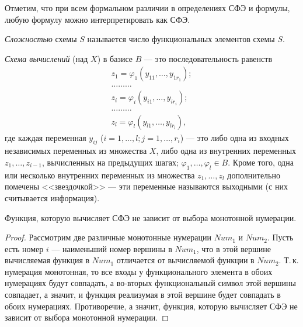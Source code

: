 Отметим, что при всем формальном различии в определениях СФЭ и формулы, любую формулу можно интерпретировать как СФЭ.

\begin{definition}
    \textit{Сложностью} схемы $S$ называется число функциональных элементов схемы $S$.
\end{definition}

\begin{definition}
    \textit{Схема вычислений} (над $X$) в базисе $B$ --- это последовательность равенств
    \begin{gather*}
        z_1 = \varphi_1(y_{11}, \ldots, y_{1r_1});\\
        \ldots \ldots \ldots\\
        z_i = \varphi_i(y_{i1}, \ldots, y_{ir_i});\\
        \ldots \ldots \ldots\\
        z_l = \varphi_l(y_{l1}, \ldots, y_{lr_l}),
    \end{gather*}
    где каждая переменная $y_{ij}$ ($i = 1, \ldots, l; j = 1, \ldots, r_i$) --- это либо одна из входных независимых переменных из множества $X$, либо одна из внутренних переменных $z_1, \ldots, z_{i-1}$, вычисленных на предыдущих шагах; $\varphi_1, \ldots, \varphi_l \in B$. Кроме того, одна или несколько внутренних переменных из множества $z_1, \ldots, z_l$ дополнительно помечены <<звездочкой>> --- эти переменные называются выходными (с них считывается информация).
\end{definition}

\begin{theorem}
    Функция, которую вычисляет СФЭ не зависит от выбора монотонной нумерации.
\end{theorem}

\begin{proof}
    Рассмотрим две различные монотонные нумерации $Num_1$ и $Num_2$. Пусть есть номер $i$ --- наименьший номер вершины в $Num_1$, что в этой вершине вычисляемая функция в $Num_1$ отличается от вычисляемой функции в $Num_2$. Т.\,к. нумерация монотонная, то все входы у функционального элемента в обоих нумерациях будут совпадать, а во-вторых функциональный символ этой вершины совпадает, а значит, и функция реализумая в этой вершине будет совпадать в обоих нумерациях. Противоречие, а значит, функция, которую вычисляет СФЭ не зависит от выбора монотонной нумерации.
\end{proof}